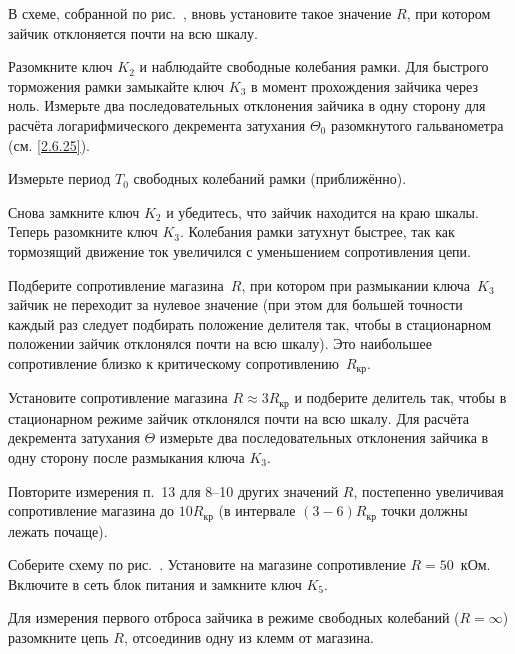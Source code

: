 \begin{lab:task}
	\item В схеме, собранной по рис.~, вновь установите такое значение
$R$, при котором зайчик отклоняется почти на всю шкалу.

	\item Разомкните ключ $K_2$ и наблюдайте свободные
колебания рамки. Для быстрого торможения рамки замыкайте ключ
$K_3$ в момент прохождения зайчика через ноль.
Измерьте два последовательных отклонения зайчика в одну сторону для
расчёта логарифмического декремента затухания $\Theta_0$ разомкнутого гальванометра
(см. \eqref{2.6.25}).

	\item Измерьте период $T_0$ свободных колебаний рамки
(приближённо).

	\item Снова замкните ключ $K_2$ и убедитесь, что
зайчик находится на краю шкалы. Теперь разомкните ключ
$K_3$. Колебания рамки затухнут быстрее, так как
тормозящий движение ток увеличился с уменьшением сопротивления цепи.

	\item Подберите  сопротивление магазина~$R$, при
котором при размыкании ключа~$K_3$ зайчик не
переходит за нулевое значение (при этом для большей точности каждый раз
следует подбирать положение делителя так, чтобы в стационарном положении
зайчик отклонялся почти на всю шкалу). Это наибольшее сопротивление
близко к критическому сопротивлению~$R_{\text{кр}}$.

	\item Установите сопротивление магазина $R \approx 3R_{\text{кр}}$ и подберите
делитель так, чтобы в стационарном режиме зайчик отклонялся почти на всю
шкалу. Для расчёта декремента затухания $\Theta$ измерьте два последовательных
отклонения зайчика в одну сторону после размыкания ключа $K_3$.

	\item Повторите измерения п.~13 для 8--10 других значений $R$,
постепенно увеличивая сопротивление магазина до $10R_{\text{кр}}$ (в интервале $(3-6)R_{\text{кр}}$
точки должны лежать почаще).


	\item Соберите схему по рис.~. Установите на магазине сопротивление
$R=50$~кОм. Включите в сеть блок питания и замкните ключ
$K_5$.

	\item Для измерения первого отброса зайчика в режиме свободных колебаний
($R = \infty$) разомкните цепь $R$, отсоединив одну из клемм от магазина.


\end{lab:task}
